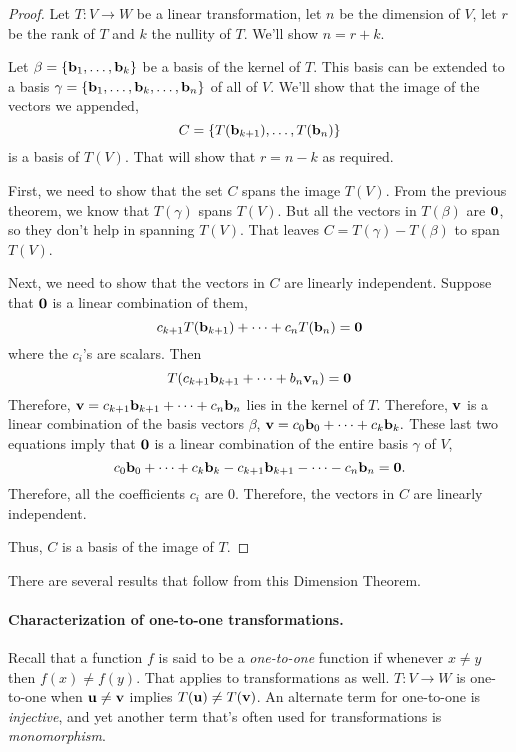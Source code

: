 \begin{proof}
Let $T:V\to W$ be a linear transformation, let $n$ be the dimension of $V$, let $r$ be the rank of $T$ and $k$ the nullity of $T$.  We'll show $n=r+k$.

Let $\beta=\{{\bf b}_1,\ldots,{\bf b}_k\}$ be a basis of the kernel of $T$.  This basis can be extended to a basis $\gamma=\{{\bf b}_1,\ldots,{\bf b}_k,\dots,{\bf b}_n\}$ of all of $V$.  We'll show that the image of the vectors we appended, 
$$C=\{T({\bf b}_{k+1}),\dots,T({\bf b}_n)\}$$ 
is a basis of $T(V)$.  That will show that $r=n-k$ as required.

First, we need to show that the set $C$ spans the image $T(V)$.  From the previous theorem, we know that $T(\gamma)$ spans $T(V)$.  But all the vectors in $T(\beta)$ are $\bf 0$, so they don't help in spanning $T(V)$.  That leaves $C=T(\gamma)-T(\beta)$ to span $T(V)$.

Next, we need to show that the vectors in $C$ are linearly independent.  Suppose that $\bf0$ is a linear combination of them,
$$c_{k+1}T({\bf b}_{k+1})+\cdots+c_{n}T({\bf b}_{n})={\bf 0}$$
where the $c_i$'s are scalars.  Then
$$T(c_{k+1}{\bf b}_{k+1}+\cdots+b_{n}{\bf v}_{n})={\bf 0}$$
Therefore, 
${\bf v}=c_{k+1}{\bf b}_{k+1}+\cdots+c_{n}{\bf b}_{n}$
lies in the kernel of $T$.
Therefore, $\bf v$ is a linear combination of the basis vectors $\beta$, 
${\bf v}=c_{0}{\bf b}_{0}+\cdots+c_{k}{\bf b}_{k}.$
These last two equations imply that $\bf 0$ is a linear combination of the entire basis $\gamma$ of $V$,
$$c_{0}{\bf b}_{0}+\cdots+c_{k}{\bf b}_{k}-c_{k+1}{\bf b}_{k+1}-\cdots-c_{n}{\bf b}_{n}={\bf0}.$$
Therefore, all the coefficients $c_i$ are 0.  Therefore, the vectors in $C$ are linearly independent.

Thus, $C$ is a basis of the image of $T$.
\end{proof}

There are several results that follow from this Dimension Theorem.

\paragraph{Characterization of one-to-one transformations.}  Recall that a function $f$ is said to be a {\em one-to-one} function if whenever $x\neq y$ then $f(x)\neq f(y)$.  That applies to transformations as well.  $T:V\to W$ is one-to-one when ${\bf u}\neq {\bf v}$ implies $T({\bf u})\neq T({\bf v})$.  An alternate term for one-to-one is {\em injective}, and yet another term that's often used for transformations is {\em monomorphism}.

